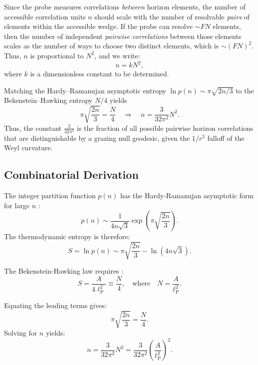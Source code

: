 \documentclass[12pt, letterpaper]{article}
\newcommand{\ellp}{\ell_{\mathrm{P}}}
\begin{document}
Since the probe measures correlations \emph{between} horizon elements, the number of accessible correlation units $n$ should scale with the number of resolvable \emph{pairs} of elements within the accessible wedge. If the probe can resolve $\sim FN$ elements, then the number of independent \emph{pairwise correlations} between those elements scales as the number of ways to choose two distinct elements, which is $\sim (FN)^2$. Thus, $n$ is proportional to $N^2$, and we write:
\[
n = k N^2,
\]
where $k$ is a dimensionless constant to be determined.

Matching the Hardy–Ramanujan asymptotic entropy $\ln p(n) \sim \pi \sqrt{2n/3}$ to the Bekenstein–Hawking entropy $N/4$ yields
\[
\pi \sqrt{\frac{2n}{3}} = \frac{N}{4} \quad \Rightarrow \quad n = \frac{3}{32\pi^2} N^2.
\]
Thus, the constant $\frac{3}{32\pi^2}$ is the fraction of all possible pairwise horizon correlations that are distinguishable by a grazing null geodesic, given the $1/r^3$ falloff of the Weyl curvature.

\subsection{Combinatorial Derivation}

The integer partition function $p(n)$ has the Hardy-Ramanujan asymptotic form for large $n$ \cite{Hardy1918}:
\begin{equation}\label{eq:partition}
p(n) \sim \frac{1}{4n\sqrt{3}} \exp\left( \pi \sqrt{\frac{2n}{3}} \right).
\end{equation}
The thermodynamic entropy is therefore:
\begin{equation}
S = \ln p(n) \sim \pi \sqrt{\frac{2n}{3}} - \ln(4n\sqrt{3}).
\end{equation}

The Bekenstein-Hawking law requires \cite{Bekenstein1972, Hawking1975}:
\begin{equation}\label{eq:BH}
S = \frac{A}{4\ellp^2} \equiv \frac{N}{4}, \quad \text{where} \quad N = \frac{A}{\ellp^2}.
\end{equation}

Equating the leading terms gives:
\begin{equation}\label{eq:leading}
\pi \sqrt{\frac{2n}{3}} = \frac{N}{4}.
\end{equation}
Solving for $n$ yields:
\begin{equation}\label{eq:n_relation}
n = \frac{3}{32\pi^2} N^2 = \frac{3}{32\pi^2} \left( \frac{A}{\ellp^2} \right)^2.
\end{equation}
\end{document}
